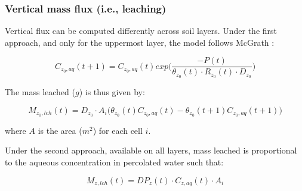 \documentclass[]{article}
\begin{document}
\subsubsection{Vertical mass flux (i.e.,
leaching)}\label{vertical-mass-flux-i.e.-leaching}

Vertical flux can be computed differently across soil layers. Under the
first approach, and only for the uppermost layer, the model follows
McGrath \citeyearpar{Mcgrath2008}:

\begin{equation}
C_{z_0,aq}(t+1) = C_{z_0,aq}(t) exp \Big( \frac{ -P(t) }{ \theta_{z_0}(t) \cdot R_{z_0}(t) \cdot D_{z_0} } \Big) 
\label{eq:conc_mcgrath}
\end{equation}

The mass leached (\(g\)) is thus given by:

\begin{equation}
M_{z_0,lch}(t) =  D_{z_0} \cdot A_i  \Big(\theta_{z_0}(t)C_{z_0,aq}(t)- \theta_{z_0}(t+1) C_{z_0,aq}(t+1) \Big) 
\label{eq:leached_mcgrath}
\end{equation}

where \(A\) is the area (\(m^2\)) for each cell \(i\).

Under the second approach, available on all layers, mass leached is
proportional to the aqueous concentration in percolated water such that:

\begin{equation}
M_{z,lch}(t) = DP_z(t) \cdot C_{z,aq }(t) \cdot A_i
\label{eq:leached_prop}
\end{equation}
\end{document}
